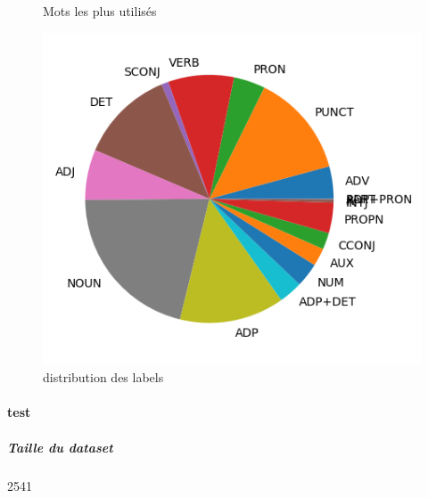 \begin{figure}[H]
\begin{minipage}{0.48\textwidth}
\begin{tabular}{|l || *{11 }{|c} |}
\end{tabular}
\caption{ Mots les plus utilisés } \label{Fig:muw}\end{minipage} 
\begin{minipage}{0.48\textwidth} \centering
\label{Fig:ftbtrain_img.png}
\caption{distribution des labels}\includegraphics[width=.7\linewidth]{ftbtrain_img.png}

\end{minipage}
\end{figure}\paragraph{test}
\subparagraph{Taille du dataset}2541
